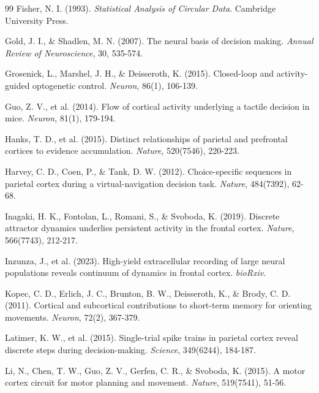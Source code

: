 \documentclass[11pt,a4paper]{article}
\begin{document}
\begin{thebibliography}{99}
Fisher, N. I. (1993). \textit{Statistical Analysis of Circular Data}. Cambridge University Press.

Gold, J. I., \& Shadlen, M. N. (2007). The neural basis of decision making. \textit{Annual Review of Neuroscience}, 30, 535-574.

Grosenick, L., Marshel, J. H., \& Deisseroth, K. (2015). Closed-loop and activity-guided optogenetic control. \textit{Neuron}, 86(1), 106-139.

Guo, Z. V., et al. (2014). Flow of cortical activity underlying a tactile decision in mice. \textit{Neuron}, 81(1), 179-194.

Hanks, T. D., et al. (2015). Distinct relationships of parietal and prefrontal cortices to evidence accumulation. \textit{Nature}, 520(7546), 220-223.

Harvey, C. D., Coen, P., \& Tank, D. W. (2012). Choice-specific sequences in parietal cortex during a virtual-navigation decision task. \textit{Nature}, 484(7392), 62-68.

Inagaki, H. K., Fontolan, L., Romani, S., \& Svoboda, K. (2019). Discrete attractor dynamics underlies persistent activity in the frontal cortex. \textit{Nature}, 566(7743), 212-217.

Inzunza, J., et al. (2023). High-yield extracellular recording of large neural populations reveals continuum of dynamics in frontal cortex. \textit{bioRxiv}.

Kopec, C. D., Erlich, J. C., Brunton, B. W., Deisseroth, K., \& Brody, C. D. (2011). Cortical and subcortical contributions to short-term memory for orienting movements. \textit{Neuron}, 72(2), 367-379.

Latimer, K. W., et al. (2015). Single-trial spike trains in parietal cortex reveal discrete steps during decision-making. \textit{Science}, 349(6244), 184-187.

Li, N., Chen, T. W., Guo, Z. V., Gerfen, C. R., \& Svoboda, K. (2015). A motor cortex circuit for motor planning and movement. \textit{Nature}, 519(7541), 51-56.


\end{thebibliography}
\end{document}
